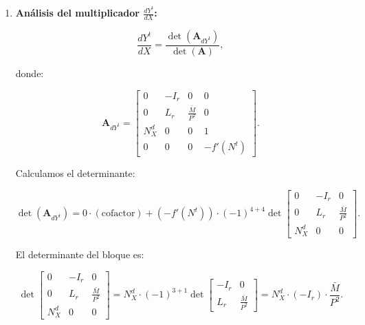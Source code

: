 \documentclass[
  doc,
  floatsintext,
  longtable,
  a4paper,
  nolmodern,
  notxfonts,
  notimes,
  12pt,
  colorlinks=true,linkcolor=blue,citecolor=blue,urlcolor=blue]{apa7}
\begin{document}
\begin{enumerate}
  El determinante es:

  \[
  \det \begin{bmatrix}
  1 - C_{Y^t} & 0 & 0 \\
  L_{Y^t} & N^d_X & \frac{\bar{M}}{P^2} \\
  1 & 0 & 0
  \end{bmatrix} = 0,
  \]

  ya que la tercera columna tiene ceros en la primera y tercera filas.
  Entonces:

  \[
  \frac{dr}{dX} = \frac{0}{-I_r \frac{\bar{M}}{P^2}} = 0.
  \]

  Esto indica que un cambio en el salario real rígido no afecta la tasa
  de interés, lo que es consistente con el modelo.
\item
  \textbf{Análisis del multiplicador \(\frac{dY^t}{dX}\):}

  \[
  \frac{dY^t}{dX} = \frac{\det(\mathbf{A}_{dY^t})}{\det(\mathbf{A})},
  \]

  donde:

  \[
  \mathbf{A}_{dY^t} = \begin{bmatrix}
  0 & -I_r & 0 & 0 \\
  0 & L_r & \frac{\bar{M}}{P^2} & 0 \\
  N^d_X & 0 & 0 & 1 \\
  0 & 0 & 0 & -f'(N^t)
  \end{bmatrix}.
  \]

  Calculamos el determinante:

  \[
  \det(\mathbf{A}_{dY^t}) = 0 \cdot (\text{cofactor}) + (-f'(N^t)) \cdot (-1)^{4+4} \det \begin{bmatrix}
  0 & -I_r & 0 \\
  0 & L_r & \frac{\bar{M}}{P^2} \\
  N^d_X & 0 & 0
  \end{bmatrix}.
  \]

  El determinante del bloque es:

  \[
  \det \begin{bmatrix}
  0 & -I_r & 0 \\
  0 & L_r & \frac{\bar{M}}{P^2} \\
  N^d_X & 0 & 0
  \end{bmatrix} = N^d_X \cdot (-1)^{3+1} \det \begin{bmatrix}
  -I_r & 0 \\
  L_r & \frac{\bar{M}}{P^2}
  \end{bmatrix} = N^d_X \cdot (-I_r) \cdot \frac{\bar{M}}{P^2}.
  \]


\end{enumerate}
\end{document}
